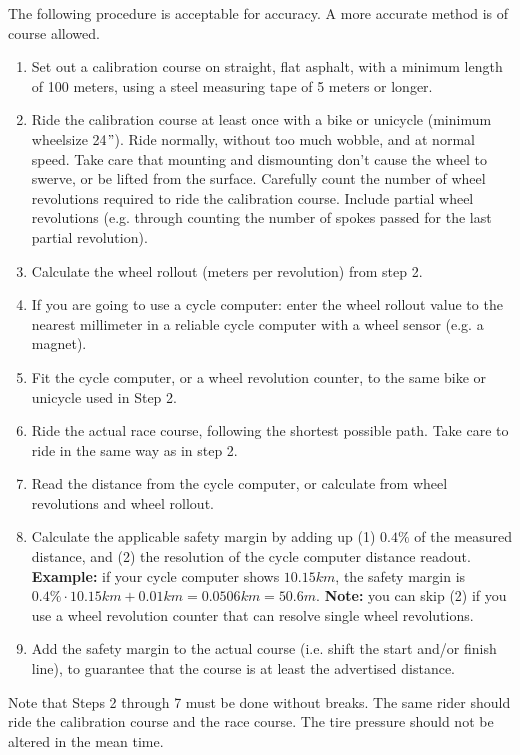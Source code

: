 The following procedure is acceptable for accuracy.
A more accurate method is of course allowed.
\begin{enumerate}
\item Set out a calibration course on straight, flat asphalt, with a minimum length of 100 meters, using a steel measuring tape of 5 meters or longer.
\item Ride the calibration course at least once with a bike or unicycle (minimum wheelsize 24$"$).
Ride normally, without too much wobble, and at normal speed.
Take care that mounting and dismounting don't cause the wheel to swerve, or be lifted from the surface.
Carefully count the number of wheel revolutions required to ride the calibration course.
Include partial wheel revolutions (e.g. through counting the number of spokes passed for the last partial revolution).
\item Calculate the wheel rollout (meters per revolution) from step 2.
\item If you are going to use a cycle computer: enter the wheel rollout value to the nearest millimeter in a reliable cycle computer with a wheel sensor (e.g. a magnet).
\item Fit the cycle computer, or a wheel revolution counter, to the same bike or unicycle used in Step 2.
\item Ride the actual race course, following the shortest possible path.
Take care to ride in the same way as in step 2.
\item Read the distance from the cycle computer, or calculate from wheel revolutions and wheel rollout.
\item Calculate the applicable safety margin by adding up (1) $0.4\%$ of the measured distance, and (2) the resolution of the cycle computer distance readout.
\textbf{Example:} if your cycle computer shows $10.15\unit{km}$, the safety margin is $0.4\% \cdot 10.15\unit{km} + 0.01\unit{km} = 0.0506\unit{km} = 50.6\unit{m}$.
\textbf{Note:} you can skip (2) if you use a wheel revolution counter that can resolve single wheel revolutions.
\item Add the safety margin to the actual course (i.e. shift the start and/or finish line), to guarantee that the course is at least the advertised distance.
\end{enumerate}
Note that Steps 2 through 7 must be done without breaks.
The same rider should ride the calibration course and the race course.
The tire pressure should not be altered in the mean time.

